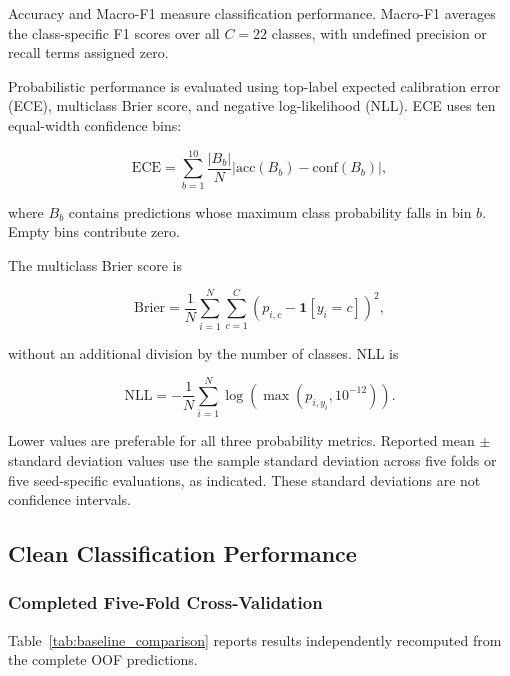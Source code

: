Accuracy and Macro-F1 measure classification performance.
Macro-F1 averages the class-specific F1 scores over all $C=22$
classes, with undefined precision or recall terms assigned zero.

Probabilistic performance is evaluated using top-label expected
calibration error (ECE), multiclass Brier score, and negative
log-likelihood (NLL). ECE uses ten equal-width confidence bins:

\begin{equation}
\mathrm{ECE}
=
\sum_{b=1}^{10}
\frac{|B_b|}{N}
\left|
\mathrm{acc}(B_b)-\mathrm{conf}(B_b)
\right|,
\label{eq:results_ece}
\end{equation}

where $B_b$ contains predictions whose maximum class probability
falls in bin $b$. Empty bins contribute zero.

The multiclass Brier score is

\begin{equation}
\mathrm{Brier}
=
\frac{1}{N}
\sum_{i=1}^{N}
\sum_{c=1}^{C}
\left(p_{i,c}-\mathbf{1}[y_i=c]\right)^2,
\label{eq:results_brier}
\end{equation}

without an additional division by the number of classes. NLL is

\begin{equation}
\mathrm{NLL}
=
-\frac{1}{N}
\sum_{i=1}^{N}
\log\!\left(\max(p_{i,y_i},10^{-12})\right).
\label{eq:results_nll}
\end{equation}

Lower values are preferable for all three probability metrics.
Reported mean $\pm$ standard deviation values use the sample
standard deviation across five folds or five seed-specific
evaluations, as indicated. These standard deviations are not
confidence intervals.

\subsection{Clean Classification Performance}

\subsubsection{Completed Five-Fold Cross-Validation}

Table~\ref{tab:baseline_comparison} reports results independently
recomputed from the complete OOF predictions.

